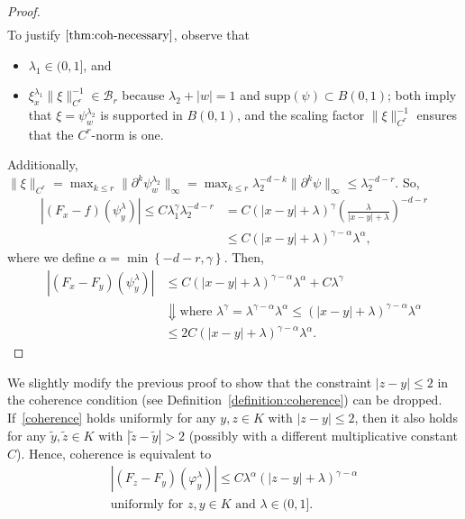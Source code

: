 \begin{proof}
\begin{align}
   \end{align}
   To justify \(\eqref{thm:coh-necessary}\), observe that 
   \begin{itemize}
       \item  \(\lambda_1 \in (0, 1]\), and 
       \item  \(\xi^{\lambda_1}_x \lVert \xi \rVert_{C^{r}}^{-1} \in \mathcal{B}_{r}\) because \(\lambda_2 + |w| = 1\) and \(\mathrm{supp}(\psi) \subset B(0,1)\); both imply that \(\xi = \psi^{\lambda_2}_w\) is supported in \(B(0,1)\), and the scaling factor \(\lVert \xi \rVert_{C^{r}}^{-1}\) ensures that the \(C^r\)-norm is one.
   \end{itemize}   
   Additionally, \(\lVert \xi \rVert_{C^{r}} = \max_{k \leq r}\lVert \partial^k \psi^{\lambda_2}_w \rVert_\infty = \max_{k \leq r} \lambda_2^{-d-k} \lVert \partial^k \psi \rVert_{\infty} \leq \lambda_2^{-d - r}\). So,
   \begin{align*}
    |(F_x - f)(\psi^\lambda_y)| \leq C\lambda_1^\gamma \lambda_2^{-d-r} &= C(|x-y| + \lambda)^\gamma\left(\frac{\lambda}{|x-y|  + \lambda}\right)^{-d-r} \\
    &\leq C  (|x-y| + \lambda)^{\gamma - \alpha} \lambda^\alpha,
   \end{align*}
    where we define \(\alpha = \min\left\{ -d-r , \gamma \right\}\). Then,
    \begin{align*}
        |(F_x - F_y)(\psi^\lambda_y)| &\leq C  (|x-y| + \lambda)^{\gamma - \alpha} \lambda^\alpha + C \lambda^\gamma \\
        &\Downarrow \text{where \(\lambda^\gamma = \lambda^{\gamma - \alpha} \lambda^\alpha \leq (|x-y| + \lambda)^{\gamma - \alpha} \lambda^\alpha\)} \\
        &\leq 2C  (|x-y| + \lambda)^{\gamma - \alpha} \lambda^\alpha.
    \end{align*}
\end{proof}

We slightly modify the previous proof to show that the constraint \(|z-y| \leq 2\) in the coherence condition (see Definition~\ref{definition:coherence}) can be dropped. If~\eqref{coherence} holds uniformly for any \(y,z \in K\) with \(|z-y| \leq 2\), then it also holds for any \(\tilde y, \tilde z \in K\) with \(|\tilde z- \tilde y| > 2\) (possibly with a different multiplicative constant \(C\)). Hence, coherence is equivalent to
\begin{gather}\label{better-coherence}
    |(F_z - F_y)(\varphi^\lambda_y)| \leq C\lambda^\alpha(|z-y| + \lambda)^{\gamma - \alpha}  \\ \text{uniformly for \(z,y \in K\) and \(\lambda \in (0,1]\)} \nonumber.
\end{gather}

